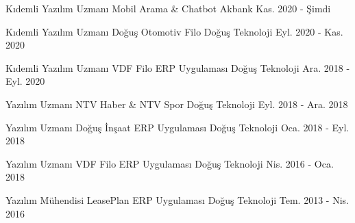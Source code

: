 

\begin{cventries}

  \cventry
    {Kıdemli Yazılım Uzmanı} %
    {Mobil Arama \& Chatbot} %
    {Akbank} %
    {Kas. 2020 - Şimdi} %
    {}

  \cventry
    {Kıdemli Yazılım Uzmanı} %
    {Doğuş Otomotiv Filo} %
    {Doğuş Teknoloji} %
    {Eyl. 2020 - Kas. 2020} %
    {}

  \cventry
    {Kıdemli Yazılım Uzmanı} %
    {VDF Filo ERP Uygulaması} %
    {Doğuş Teknoloji} %
    {Ara. 2018 - Eyl. 2020} %
    {}

  \cventry
    {Yazılım Uzmanı} %
    {NTV Haber \& NTV Spor} %
    {Doğuş Teknoloji} %
    {Eyl. 2018 - Ara. 2018} %
    {}

  \cventry
    {Yazılım Uzmanı} %
    {Doğuş İnşaat ERP Uygulaması} %
    {Doğuş Teknoloji} %
    {Oca. 2018 - Eyl. 2018} %
    {}

  \cventry
    {Yazılım Uzmanı} %
    {VDF Filo ERP Uygulaması} %
    {Doğuş Teknoloji} %
    {Nis. 2016 - Oca. 2018} %
    {}

  \cventry
    {Yazılım Mühendisi} %
    {LeasePlan ERP Uygulaması} %
    {Doğuş Teknoloji} %
    {Tem. 2013 - Nis. 2016} %
    {}

\end{cventries}
